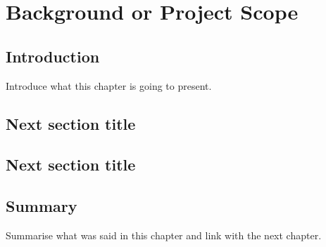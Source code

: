 \chapter{Background or Project Scope}

\section{Introduction}
Introduce what this chapter is going to present.
\section{Next section title}

\section{Next section title}

\section{Summary}
Summarise what was said in this chapter and link with the next chapter.